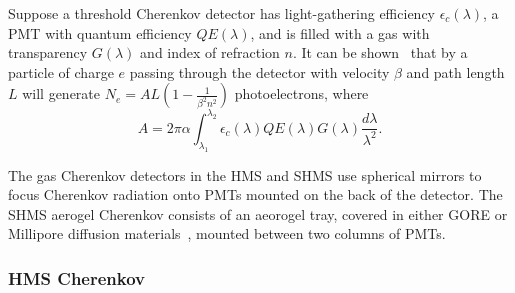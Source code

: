 Suppose a threshold Cherenkov detector has
light-gathering efficiency $\epsilon_c(\lambda)$,
a PMT with quantum efficiency $QE(\lambda)$,
and is filled with a gas with transparency $G(\lambda)$
and index of refraction $n$.
It can be shown~\cite{NGC_Design_Report} that by a particle of charge $e$ passing through the detector
with velocity $\beta$ and path length $L$ will generate
$N_e =AL\left(1-\frac{1}{\beta^2n^2}\right)$ photoelectrons, where
\begin{equation}
A = 2 \pi \alpha \int_{\lambda_1}^{\lambda_2} \epsilon_c(\lambda)QE(\lambda)G(\lambda)\frac{d\lambda}{\lambda^2}.
\end{equation}

The gas Cherenkov detectors in the HMS and SHMS use spherical mirrors to focus
Cherenkov radiation onto PMTs mounted on the back of the detector. The SHMS
aerogel Cherenkov consists of an aeorogel tray, covered in either GORE or
Millipore diffusion materials~\cite{Horn_2017}, mounted between two columns
of PMTs.

\subsubsection{HMS Cherenkov}

